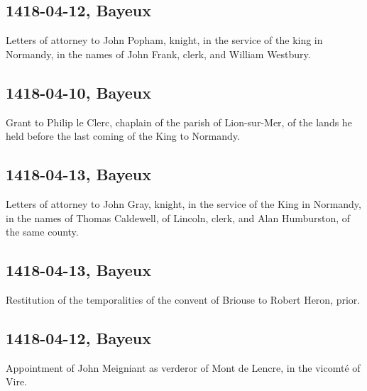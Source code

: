 \documentclass[a4paper,12pt,twoside]{book}
\begin{document}
                
                \subsection{1418-04-12, Bayeux}
                
                
                     Letters of attorney to John Popham, knight, in the service of the king in Normandy, in the names of John Frank, clerk, and William Westbury.
                  
                
                \subsection{1418-04-10, Bayeux}
                
                
                     Grant to Philip le Clerc, chaplain of the parish of Lion-sur-Mer, of the lands he held before the last coming of the King to Normandy.
                  
                
                \subsection{1418-04-13, Bayeux}
                
                
                     Letters of attorney to John Gray, knight, in the service of the King in Normandy, in the names of Thomas Caldewell, of Lincoln, clerk, and Alan Humburston, of the same county.
                  
                
                \subsection{1418-04-13, Bayeux}
                
                
                     Restitution of the temporalities of the convent of Briouse to Robert Heron, prior.
                  
                
                \subsection{1418-04-12, Bayeux}
                
                
                     Appointment of John Meigniant as verderor of Mont de Lencre, in the vicomté of Vire.
                  
\end{document}
